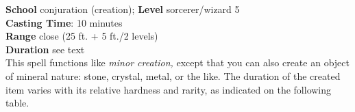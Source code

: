 \textbf{School} conjuration (creation); \textbf{Level} sorcerer/wizard 5\\
\textbf{Casting Time}: 10 minutes\\
\textbf{Range} close (25 ft. + 5 ft./2 levels)\\
\textbf{Duration} see text\\
This spell functions like \textit{minor creation, }except that you can also create an object of mineral nature: stone, crystal, metal, or the like. The duration of the created item varies with its relative hardness and rarity, as indicated on the following table.\\
